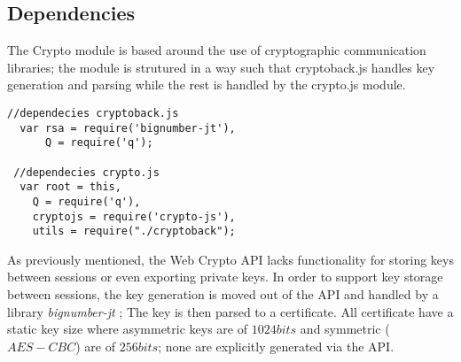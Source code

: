 \subsection{Dependencies}
The Crypto module is based around the use of cryptographic communication libraries; the module is strutured in a way such that cryptoback.js handles key generation and parsing while the rest is handled by the crypto.js module.
\begin{Code}
\begin{lstlisting}[caption={Included database operations}, label={lst:api}]
 //dependecies cryptoback.js
  var rsa = require('bignumber-jt'),
      Q = require('q');

 //dependecies crypto.js
  var root = this,
    Q = require('q'),
    cryptojs = require('crypto-js'),
    utils = require("./cryptoback");
\end{lstlisting}
\end{Code}
As previously mentioned, the Web Crypto API lacks functionality for storing keys between sessions or even exporting private keys. In order to support key storage between sessions, the key generation is moved out of the API and handled by a library \emph{bignumber-jt} \cite{Bignumber:Online}; The key is then parsed to a certificate.
All certificate have a static key size where asymmetric keys are of $1024bits$ and symmetric ($AES-CBC$) are of $256bits$; none are explicitly generated via the API.


